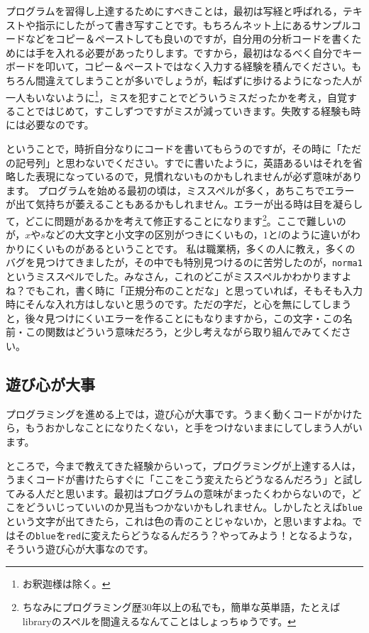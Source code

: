 \documentclass{ltjsbook}
\begin{document}
プログラムを習得し上達するためにすべきことは，最初は写経と呼ばれる，テキストや指示にしたがって書き写すことです。もちろんネット上にあるサンプルコードなどをコピー＆ペーストしても良いのですが，自分用の分析コードを書くためには手を入れる必要があったりします。ですから，最初はなるべく自分でキーボードを叩いて，コピー＆ペーストではなく入力する経験を積んでください。もちろん間違えてしまうことが多いでしょうが，転ばずに歩けるようになった人が一人もいないように\footnote{お釈迦様は除く。}，ミスを犯すことでどういうミスだったかを考え，自覚することではじめて，すこしずつですがミスが減っていきます。失敗する経験も時には必要なのです。

ということで，時折自分なりにコードを書いてもらうのですが，その時に「ただの記号列」と思わないでください。すでに書いたように，英語あるいはそれを省略した表現になっているので，見慣れないものかもしれませんが必ず意味があります。
プログラムを始める最初の頃は，ミススペルが多く，あちこちでエラーが出て気持ちが萎えることもあるかもしれません。エラーが出る時は目を凝らして，どこに問題があるかを考えて修正することになります\footnote{ちなみにプログラミング歴30年以上の私でも，簡単な英単語，たとえばlibraryのスペルを間違えるなんてことはしょっちゅうです。}。ここで難しいのが，$x$や$s$などの大文字と小文字の区別がつきにくいもの，$1$と$l$のように違いがわかりにくいものがあるということです。
私は職業柄，多くの人に教え，多くのバグを見つけてきましたが，その中でも特別見つけるのに苦労したのが，\texttt{norma1}というミススペルでした。みなさん，これのどこがミススペルかわかりますよね？でもこれ，書く時に「正規分布のことだな」と思っていれば，そもそも入力時にそんな入れ方はしないと思うのです。ただの字だ，と心を無にしてしまうと，後々見つけにくいエラーを作ることにもなりますから，この文字・この名前・この関数はどういう意味だろう，と少し考えながら取り組んでみてください。

\subsection{遊び心が大事}
プログラミングを進める上では，遊び心が大事です。うまく動くコードがかけたら，もうおかしなことになりたくない，と手をつけないままにしてしまう人がいます。

ところで，今まで教えてきた経験からいって，プログラミングが上達する人は，うまくコードが書けたらすぐに「ここをこう変えたらどうなるんだろう」と試してみる人だと思います。最初はプログラムの意味がまったくわからないので，どこをどういじっていいのか見当もつかないかもしれません。しかしたとえば\texttt{blue}という文字が出てきたら，これは色の青のことじゃないか，と思いますよね。ではその\texttt{blue}を\texttt{red}に変えたらどうなるんだろう？やってみよう！となるような，そういう遊び心が大事なのです。
\end{document}
